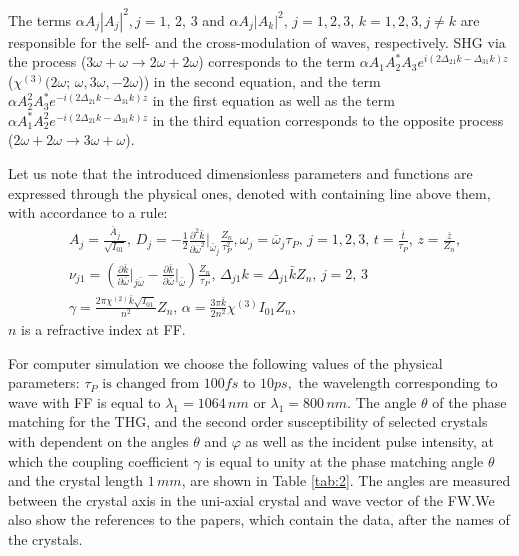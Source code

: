 \documentclass[a4paper, 12pt, onecolumn]{extarticle}
\begin{document}
The terms \(\alpha A_j|A_j|^2, j=1,\,2,\,3\) and \(\alpha A_j|A_k|^2,\,j=1,2,3,\,k=1,2,3,j\ne k\) are responsible for the self- and the cross-modulation of waves, respectively. SHG via the process (\(3\omega+\omega\rightarrow2\omega+2\omega\)) corresponds to the term \(\alpha A_1A_2^*A_3e^{i(2\Delta_{21}k-\Delta_{31}k )z}\) (\(\chi^{(3)}(2\omega;\,\omega,3\omega,-2\omega\))) in the second equation, and the term \(\alpha A_2^2 A_3^*e^{-i(2\Delta_{21}k-\Delta_{31}k )z}\) in the first equation as well as the term \(\alpha A_1^* A_2^2 e^{-i(2\Delta_{21}k-\Delta_{31}k )z}\) in the third equation corresponds to the opposite process (\(2\omega+2\omega\rightarrow3\omega+\omega\)). 

 Let us note that the introduced dimensionless parameters and functions are expressed through the physical ones, denoted with containing line above them, with accordance to a rule:
\begin{equation}
\label{eq:pars}
\begin{aligned}
&A_j=\frac{\bar{A}_j}{\sqrt{I_{01}}},\,D_j=-\frac{1}{2}\frac{\partial^2 \bar{k}}{\partial \bar{\omega}^2}\Big|_{\bar{\omega}_j}\frac{Z_n}{\tau_P^2},\omega_j=\bar{\omega}_j\tau_P,\,j=1,2,3,\,t=\frac{\bar{t}}{\tau_P},\,z=\frac{\bar{z}}{Z_n},\\
&\nu_{j1}=\left(\frac{\partial \bar{k}}{\partial \bar{\omega}}\Big|_{j\bar{\omega}}-\frac{\partial \bar{k}}{\partial \bar{\omega}}\Big|_{\bar{\omega}}\right)\frac{Z_n}{\tau_P},\,\Delta_{j1}k=\Delta_{j1}\bar{k}Z_n,\,j=2,\,3\\
&\gamma=\frac{2\pi\chi^{(2)}\bar{k}\sqrt{I_{01}}}{n^2}Z_n,\,\alpha=\frac{3\pi \bar{k}}{2n^2}\chi^{(3)}I_{01} Z_n,
\end{aligned}
\end{equation}
$n$ is a refractive index at FF.

For computer simulation we choose the following values of the physical parameters: \(\tau_P \text{ is changed from } 100fs\text{ to }10ps,\) the wavelength corresponding to wave with FF is equal to \(\lambda_1=1064\,nm\) or \(\lambda_1=800\,nm\).  The angle \(\theta\) of the phase matching for the THG, and the second order susceptibility of selected crystals with dependent on the angles \(\theta\) and \(\varphi\) as well as the incident pulse intensity, at which the coupling coefficient \(\gamma\) is equal to unity at the phase matching angle \(\theta\) and the crystal length $1\,mm$, are shown in Table \ref{tab:2}. The angles are measured between the crystal axis in the uni-axial crystal and wave vector of the FW.We also show the references to the papers, which contain the data, after the names of the crystals.
\end{document}
